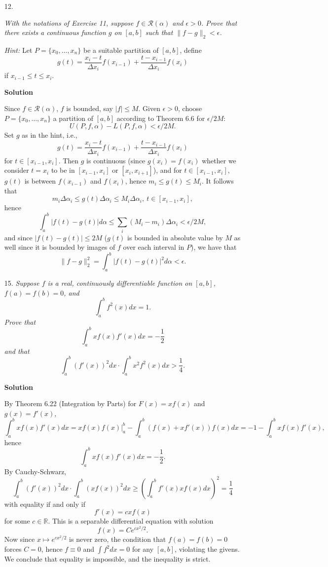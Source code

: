 \documentclass{article}
\begin{document}
\begin{enumerate}
\begin{itemize}
\item[12.] {\em With the notations of Exercise 11, suppose \(f \in \mathcal{R}(\alpha)\) and \(\epsilon > 0\).  Prove that there exists a continuous function \(g\) on \([a,b]\) such that \(\|f - g\|_2 < \epsilon\).

{\em Hint:}  Let \(P = \{x_0, \ldots, x_n\}\) be a suitable partition of \([a,b]\), define
\[g(t) = \frac{x_i - t}{\Delta x_i} f(x_{i - 1}) + \frac{t - x_{i - 1}}{\Delta x_i} f(x_i)\]
if \(x_{i - 1} \leq t \leq x_i\).}

{\bf Solution}

Since \(f \in \mathcal{R}(\alpha)\), \(f\) is bounded, say \(|f| \leq M\).  Given \(\epsilon > 0\), choose \(P = \{x_0, \ldots, x_n\}\) a partition of \([a,b]\) according to Theorem 6.6 for \(\epsilon / 2M\):
\[U(P,f,\alpha) - L(P,f,\alpha) < \epsilon / 2M.\]
Set \(g\) as in the hint, i.e.,
\[g(t) = \frac{x_i - t}{\Delta x_i} f(x_{i - 1}) + \frac{t - x_{i - 1}}{\Delta x_i} f(x_i)\]
for \(t \in [x_{i - 1}, x_i]\).  Then \(g\) is continuous (since \(g(x_i) = f(x_i)\) whether we consider \(t = x_i\) to be in \([x_{i - 1}, x_i]\) or \([x_i, x_{i + 1}]\)), and for \(t \in [x_{i - 1}, x_i]\), \(g(t)\) is between \(f(x_{i - 1})\) and \(f(x_i)\), hence \(m_i \leq g(t) \leq M_i\).  It follows that
\[m_i \Delta\alpha_i \leq g(t) \Delta\alpha_i \leq M_i \Delta\alpha_i, \ t \in [x_{i - 1}, x_i],\]
hence
\[\int_a^b |f(t) - g(t)| d\alpha \leq \sum_i (M_i - m_i) \Delta\alpha_i < \epsilon / 2M,\]
and since \(|f(t) - g(t)| \leq 2M\) (\(g(t)\) is bounded in absolute value by \(M\) as well since it is bounded by images of \(f\) over each interval in \(P\)), we have that
\[\|f - g\|_2^2 = \int_a^b |f(t) - g(t)|^2 d\alpha < \epsilon.\]




\item[15.] {\em Suppose \(f\) is a real, continuously differentiable function on \([a,b]\), \(f(a) = f(b) = 0\), and
\[\int_a^b f^2(x) dx = 1.\]
Prove that
\[\int_a^b x f(x) f'(x) dx = -\frac{1}{2}\]
and that
\[\int_a^b \left( f'(x) \right)^2 dx \cdot \int_a^b x^2 f^2(x) dx > \frac{1}{4}.\]}

{\bf Solution}

By Theorem 6.22 (Integration by Parts) for \(F(x) = x f(x)\) and \(g(x) = f'(x)\),
\[\int_a^b x f(x) f'(x) dx
  = \left. x f(x) f(x) \right|_a^b - \int_a^b (f(x) + x f'(x)) f(x) dx
  = -1 - \int_a^b x f(x) f'(x),\]
hence
\[\int_a^b x f(x) f'(x) dx = -\frac{1}{2}.\]
By Cauchy-Schwarz,
\[\int_a^b \left( f'(x) \right)^2 dx \cdot \int_a^b \left( x f(x) \right)^2 dx
  \geq \left( \int_a^b f'(x) x f(x) dx \right)^2 = \frac{1}{4}\]
with equality if and only if
\[f'(x) = c x f(x)\]
for some \(c \in \mathbb{R}\).  This is a separable differential equation with solution
\[f(x) = C e^{cx^2/2}.\]
Now since \(x \mapsto e^{cx^2/2}\) is never zero, the condition that \(f(a) = f(b) = 0\) forces \(C = 0\), hence \(f \equiv 0\) and \(\int f^2 dx = 0\) for any \([a,b]\), violating the givens.  We conclude that equality is impossible, and the inequality is strict.




\end{itemize}
\end{enumerate}
\end{document}
